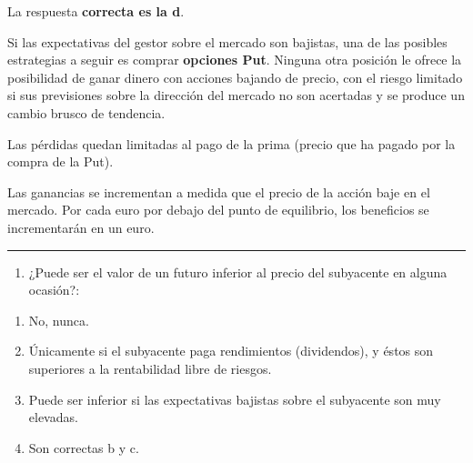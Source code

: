 \documentclass[
  letterpaper,
  DIV=11,
  numbers=noendperiod]{scrreprt}
\providecommand{\tightlist}{%
  \setlength{\itemsep}{0pt}\setlength{\parskip}{0pt}}\usepackage{longtable,booktabs,array}
\begin{document}
\begin{tcolorbox}[enhanced jigsaw, left=2mm, opacityback=0, colback=white, breakable, arc=.35mm, bottomrule=.15mm, rightrule=.15mm, toprule=.15mm, leftrule=.75mm, colframe=quarto-callout-tip-color-frame]
\begin{minipage}[t]{5.5mm}
\textcolor{quarto-callout-tip-color}{\faLightbulb}
\end{minipage}%
\begin{minipage}[t]{\textwidth - 5.5mm}

La respuesta \textbf{correcta es la d}.

Si las expectativas del gestor sobre el mercado son bajistas, una de las
posibles estrategias a seguir es comprar \textbf{opciones Put}. Ninguna
otra posición le ofrece la posibilidad de ganar dinero con acciones
bajando de precio, con el riesgo limitado si sus previsiones sobre la
dirección del mercado no son acertadas y se produce un cambio brusco de
tendencia.

Las pérdidas quedan limitadas al pago de la prima (precio que ha pagado
por la compra de la Put).

Las ganancias se incrementan a medida que el precio de la acción baje en
el mercado. Por cada euro por debajo del punto de equilibrio, los
beneficios se incrementarán en un euro.

\end{minipage}%
\end{tcolorbox}

\begin{center}\rule{0.5\linewidth}{0.5pt}\end{center}

\begin{enumerate}
\def\labelenumi{\arabic{enumi}.}
\setcounter{enumi}{4}
\tightlist
\item
  ¿Puede ser el valor de un futuro inferior al precio del subyacente en
  alguna ocasión?:
\end{enumerate}

\begin{enumerate}
\def\labelenumi{\alph{enumi})}
\item
  No, nunca.
\item
  Únicamente si el subyacente paga rendimientos (dividendos), y éstos
  son superiores a la rentabilidad libre de riesgos.
\item
  Puede ser inferior si las expectativas bajistas sobre el subyacente
  son muy elevadas.
\item
  Son correctas b y c.
\end{enumerate}
\end{document}
